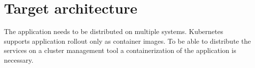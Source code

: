 \section{Target architecture}
The application needs to be distributed on multiple systems. Kubernetes supports application rollout only as container images. To be able to distribute the services on a cluster management tool a containerization of the application is necessary.

